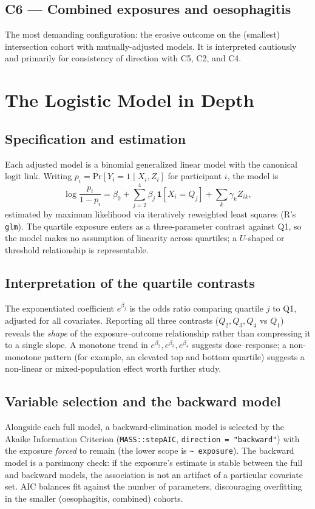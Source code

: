 \documentclass[11pt]{article}
\newcommand{\ind}{\mathbf{1}}}
\providecommand{\Pr}{\mathrm{Pr}}
\newcommand{\code}[1]{\texttt{\small #1}}
\begin{document}
\subsection{C6 --- Combined exposures and oesophagitis}
The most demanding configuration: the erosive outcome on the (smallest) intersection cohort with
mutually-adjusted models. It is interpreted cautiously and primarily for consistency of direction with
C5, C2, and C4.

\section{The Logistic Model in Depth}
\subsection{Specification and estimation}
Each adjusted model is a binomial generalized linear model with the canonical logit link. Writing
$p_i = \Pr[Y_i = 1 \mid X_i, Z_i]$ for participant $i$, the model is
\[
\log\!\frac{p_i}{1-p_i} = \beta_0 + \sum_{j=2}^{4}\beta_j\,\ind[X_i = Q_j] + \sum_k \gamma_k Z_{ik},
\]
estimated by maximum likelihood via iteratively reweighted least squares (R's \code{glm}). The
quartile exposure enters as a three-parameter contrast against Q1, so the model makes no assumption of
linearity across quartiles; a $U$-shaped or threshold relationship is representable.

\subsection{Interpretation of the quartile contrasts}
The exponentiated coefficient $e^{\beta_j}$ is the odds ratio comparing quartile $j$ to Q1, adjusted
for all covariates. Reporting all three contrasts ($Q_2, Q_3, Q_4$ vs $Q_1$) reveals the \emph{shape}
of the exposure--outcome relationship rather than compressing it to a single slope. A monotone trend in
$e^{\beta_2}, e^{\beta_3}, e^{\beta_4}$ suggests dose--response; a non-monotone pattern (for example, an
elevated top and bottom quartile) suggests a non-linear or mixed-population effect worth further study.

\subsection{Variable selection and the backward model}
Alongside each full model, a backward-elimination model is selected by the Akaike Information Criterion
(\code{MASS::stepAIC}, \code{direction = "backward"}) with the exposure \emph{forced} to remain (the
lower scope is \code{\textasciitilde{} exposure}). The backward model is a parsimony check: if the
exposure's estimate is stable between the full and backward models, the association is not an artifact
of a particular covariate set. AIC balances fit against the number of parameters, discouraging
overfitting in the smaller (oesophagitis, combined) cohorts.
\end{document}

